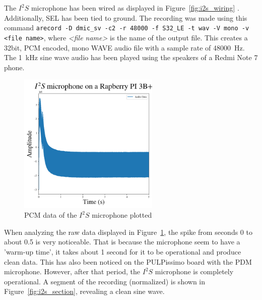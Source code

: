 The $I^2S$ microphone has been wired as displayed in Figure~\ref{fig:i2s_wiring} \cite{i2s_wiring}.
Additionally, SEL has been tied to ground.
The recording was made using this command \lstinline{arecord -D dmic_sv -c2 -r 48000 -f S32_LE -t wav -V mono -v <file name>},
where \emph{<file name>} is the name of the output file.
This creates a 32bit, PCM encoded, mono WAVE audio file with a sample rate of \SI{48000}{\hertz}.
The \SI{1}{\kilo\hertz} sine wave audio has been played using the speakers of a Redmi Note 7 phone.


\begin{figure}[H]
    \centering
    \includegraphics[width=0.6\textwidth]{figures/i2s/i2s_raw_data.png}
    \caption[PCM data of the $I^2S$ microphone plotted]{PCM data of the $I^2S$ microphone plotted}
    \label{fig:i2s_raw}
\end{figure}

When analyzing the raw data displayed in Figure~\ref{fig:i2s_raw}, the spike from seconds 0 to about 0.5
is very noticeable. That is because the microphone seem to have a 'warm-up time', it takes about 1 second for it to be operational and produce clean data.
This has also been noticed on the PULPissimo board with the PDM microphone.
However, after that period, the $I^2S$ microphone is completely operational.
A segment of the recording (normalized) is shown in Figure~\ref{fig:i2s_section}, revealing a clean sine wave.

